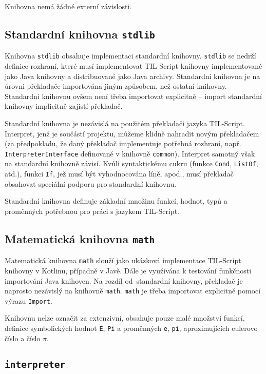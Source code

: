 Knihovna nemá žádné externí závislosti.

\subsection{Standardní knihovna \lstinline{stdlib}}

Knihovna \lstinline{stdlib} obsahuje implementaci standardní knihovny. \lstinline{stdlib}
se nedrží definice rozhraní, které musí implementovat TIL-Script knihovny implementované jako Java
knihovny a distribuované jako Java archivy. Standardní knihovna je na úrovni překladače importována
jiným způsobem, než ostatní knihovny. Standardní knihovnu ovšem není třeba importovat explicitně --
import standardní knihovny implicitně zajistí překladač.

Standardní knihovna je nezávislá na použitém překladači jazyka TIL-Script. Interpret, jenž je
součástí projektu, můžeme klidně nahradit novým překladačem (za předpokladu, že daný překladač
implementuje potřebná rozhraní, např. \lstinline{InterpreterInterface} definované v knihovně
\lstinline{common}). Interpret samotný však na standardní knihovně závisí. Kvůli syntaktickému
cukru (funkce \lstinline{Cond}, \lstinline{ListOf}, atd.), funkci \lstinline{If}, jež musí být
vyhodnocována líně, apod., musí překladač obsahovat speciální podporu pro standardní knihovnu.

Standardní knihovna definuje základní množinu funkcí, hodnot, typů a proměnných potřebnou pro práci
s jazykem TIL-Script.

\subsection{Matematická knihovna \lstinline{math}}

Matematická knihovna \lstinline{math} slouží jako ukázková implementace TIL-Script knihovny
v Kotlinu, případně v Javě. Dále je využívána k testování funkčnosti importování Java knihoven.
Na rozdíl od~standardní knihovny, překladač je naprosto nezávislý na knihovně \lstinline{math}.
\lstinline{math} je třeba importovat explicitně pomocí výrazu \lstinline{Import}.

Knihovnu nelze označit za extenzivní, obsahuje pouze malé množství funkcí, definice symbolických
hodnot \lstinline{E}, \lstinline{Pi} a proměnných \lstinline{e}, \lstinline{pi}, aproximujících
eulerovo číslo a číslo $\pi$.

\subsection{\lstinline{interpreter}}

